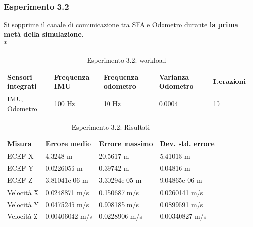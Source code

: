 \subsubsection{Esperimento 3.2}
Si sopprime il canale di comunicazione tra SFA e Odometro durante \textbf{la prima met\`a della simulazione}.\\*
\begin{table}[h]
	\centering
\begin{tabular}{|p{3.25cm}|p{2cm}|p{2cm}|p{2cm}|p{2cm}|}
	\hline 
	\textbf{Sensori integrati} & \textbf{Frequenza IMU}  & \textbf{Frequenza odometro} & \textbf{Varianza Odometro} & \textbf{Iterazioni} \\ 
	\hline 
	IMU, Odometro & 100 Hz & 10 Hz & 0.0004 & 10 \\
	\hline 
\end{tabular}
	\caption{Esperimento 3.2: workload}
\end{table}
\begin{table}[h]
	\centering
	\begin{tabular}{|p{2cm}|p{3.2cm}|p{3cm}|p{3cm}|}
		\hline 
		\textbf{Misura} 
		& \textbf{Errore medio} 
		& \textbf{Errore massimo}
		& \textbf{Dev. std. errore}\\ 
		\hline 
		ECEF X & 4.3248 m & 20.5617 m & 5.41018 m \\ 
		\hline 
		ECEF Y & 0.0226056 m & 0.39742 m & 0.04816 m \\ 
		\hline 
		ECEF Z & 3.81041e-06 m & 3.30294e-05 m & 9.04865e-06 m \\ 
		\hline 
		Velocit\`a X & 0.0248871 m/s & 0.150687 m/s & 0.0260141 m/s \\ 
		\hline 
		Velocit\`a Y & 0.0475246 m/s & 0.908185 m/s & 0.0899591 m/s \\ 
		\hline 
		Velocit\`a Z & 0.00406042 m/s & 0.0228906 m/s & 0.00340827 m/s \\ 
		\hline 
	\end{tabular} 
	\caption{Esperimento 3.2: Risultati}
\end{table}
